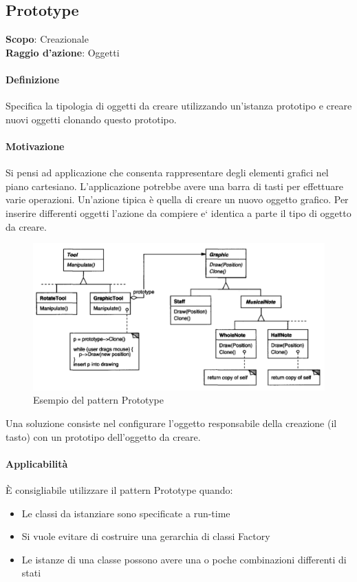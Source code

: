\subsection{Prototype}
\label{prototype}

\textbf{Scopo}: Creazionale \\
\textbf{Raggio d'azione}: Oggetti

\paragraph{Definizione} Specifica la tipologia di oggetti da creare utilizzando un'istanza prototipo e creare nuovi oggetti clonando questo prototipo.

\paragraph{Motivazione} Si pensi ad applicazione che consenta rappresentare degli elementi grafici nel piano cartesiano. L’applicazione potrebbe avere una barra di tasti per effettuare varie operazioni. Un’azione tipica è quella di creare un nuovo oggetto grafico. Per inserire differenti oggetti l’azione da compiere e` identica a parte il tipo di oggetto da creare.

\begin{figure}[H]
    \centering
    \includegraphics[width=0.75\linewidth]{assets/pattern/prototype/prototype-esempio.png}
    \caption{Esempio del pattern Prototype}
\end{figure}

Una soluzione consiste nel configurare l’oggetto responsabile della creazione (il tasto) con un prototipo dell’oggetto da creare.

\paragraph{Applicabilità} È consigliabile utilizzare il pattern Prototype quando:
\begin{itemize}
    \item Le classi da istanziare sono specificate a run-time
    \item Si vuole evitare di costruire una gerarchia di classi Factory
    \item Le istanze di una classe possono avere una o poche combinazioni differenti di stati
\end{itemize}

